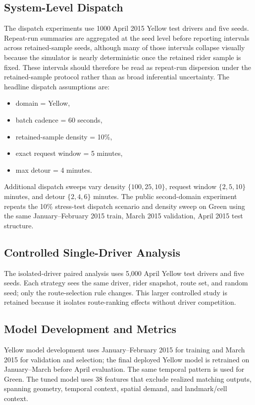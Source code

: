 \documentclass[journal]{IEEEtran}
\begin{document}
\subsection{System-Level Dispatch}
The dispatch experiments use 1000 April 2015 Yellow test drivers and five seeds. Repeat-run summaries are aggregated at the seed level before reporting intervals across retained-sample seeds, although many of those intervals collapse visually because the simulator is nearly deterministic once the retained rider sample is fixed. These intervals should therefore be read as repeat-run dispersion under the retained-sample protocol rather than as broad inferential uncertainty. The headline dispatch assumptions are:
\begin{itemize}
    \item domain = Yellow,
    \item batch cadence = 60 seconds,
    \item retained-sample density = 10\%,
    \item exact request window = 5 minutes,
    \item max detour = 4 minutes.
\end{itemize}

Additional dispatch sweeps vary density \(\{100,25,10\}\), request window \(\{2,5,10\}\) minutes, and detour \(\{2,4,6\}\) minutes. The public second-domain experiment repeats the 10\% stress-test dispatch scenario and density sweep on Green using the same January--February 2015 train, March 2015 validation, April 2015 test structure.

\subsection{Controlled Single-Driver Analysis}
The isolated-driver paired analysis uses 5{,}000 April Yellow test drivers and five seeds. Each strategy sees the same driver, rider snapshot, route set, and random seed; only the route-selection rule changes. This larger controlled study is retained because it isolates route-ranking effects without driver competition.

\subsection{Model Development and Metrics}
Yellow model development uses January--February 2015 for training and March 2015 for validation and selection; the final deployed Yellow model is retrained on January--March before April evaluation. The same temporal pattern is used for Green. The tuned model uses 38 features that exclude realized matching outputs, spanning geometry, temporal context, spatial demand, and landmark/cell context.
\end{document}
